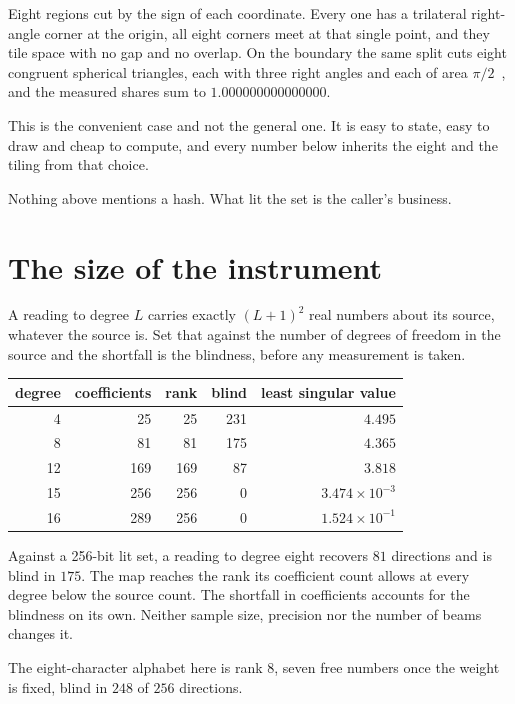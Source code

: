 Eight regions cut by the sign of each coordinate. Every one has a trilateral right-angle corner at the origin, all eight corners meet at that single point, and they tile space with no gap and no overlap. On the boundary the same split cuts eight congruent spherical triangles, each with three right angles and each of area \(\pi/2\)~\cite{src:Girard-1629}, and the measured shares sum to \(1.000000000000000\).

This is the convenient case and not the general one. It is easy to state, easy to draw and cheap to compute, and every number below inherits the eight and the tiling from that choice.

Nothing above mentions a hash. What lit the set is the caller's business.

\section{The size of the instrument}

A reading to degree \(L\) carries exactly \((L+1)^2\) real numbers about its source, whatever the source is. Set that against the number of degrees of freedom in the source and the shortfall is the blindness, before any measurement is taken.

\begin{center}
\begin{tabular}{@{}rrrrr@{}}
\toprule
degree & coefficients & rank & blind & least singular value \\
\midrule
4 & 25 & 25 & 231 & \(4.495\) \\
8 & 81 & 81 & 175 & \(4.365\) \\
12 & 169 & 169 & 87 & \(3.818\) \\
15 & 256 & 256 & 0 & \(3.474 \times 10^{-3}\) \\
16 & 289 & 256 & 0 & \(1.524 \times 10^{-1}\) \\
\bottomrule
\end{tabular}
\end{center}

Against a 256-bit lit set, a reading to degree eight recovers \(81\) directions and is blind in \(175\). The map reaches the rank its coefficient count allows at every degree below the source count. The shortfall in coefficients accounts for the blindness on its own. Neither sample size, precision nor the number of beams changes it.

The eight-character alphabet here is rank \(8\), seven free numbers once the weight is fixed, blind in \(248\) of \(256\) directions.

